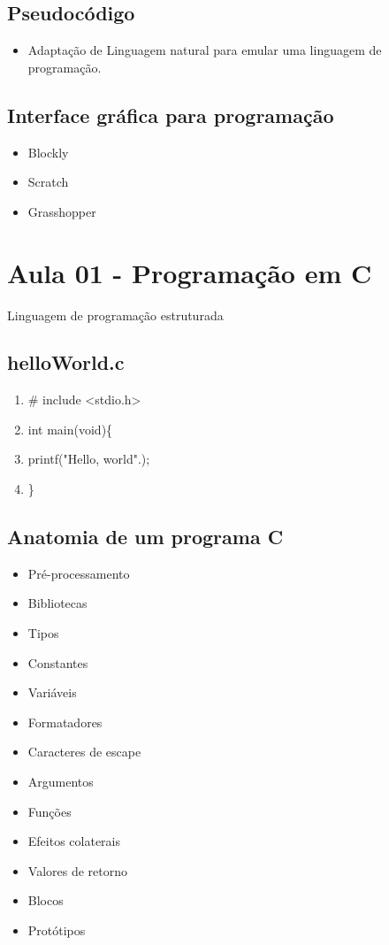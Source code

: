 \documentclass[12pt,a4paper]{article} %
\begin{document}
\subsection{Pseudocódigo}
\begin{itemize}
\item Adaptação de Linguagem natural para emular uma linguagem de programação.
\end{itemize}

\subsection{Interface gráfica para programação}
\begin{itemize}
\item Blockly
\item Scratch
\item Grasshopper
\end{itemize}

\section{Aula 01 - Programação em C}
Linguagem de programação estruturada

\subsection{helloWorld.c}
\begin{enumerate}
\item \# include <stdio.h>
\item int main(void)\{
\item \tabto{1.1cm}printf("Hello, world".);
\item \}
\end{enumerate}

\subsection{Anatomia de um programa C}
\begin{itemize}
\item Pré-processamento
\item Bibliotecas
\item Tipos
\item Constantes
\item Variáveis
\item Formatadores
\item Caracteres de escape
\item Argumentos
\item Funções
\item Efeitos colaterais
\item Valores de retorno
\item Blocos
\item Protótipos
\end{itemize}
\end{document}
